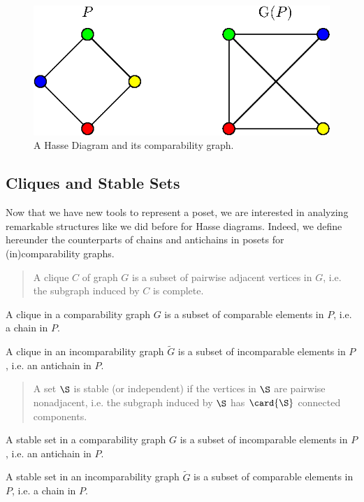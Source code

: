\begin{figure}
\centering
\includegraphics[height=0.2\textheight]{fig/comp-graph}
\caption{\label{fig:comp-graph} A Hasse Diagram and its comparability graph.}
\end{figure}




\subsection*{Cliques and Stable Sets}


Now that we have new tools to represent a poset, we are interested in analyzing
remarkable structures like we did before for Hasse diagrams. Indeed, we define
hereunder the counterparts of chains and antichains in posets for
(in)comparability graphs.

\begin{quotation}
A clique $C$ of graph $G$ is a subset of pairwise adjacent vertices in $G$,
i.e. the subgraph induced by $C$ is complete.
\end{quotation}

A clique in a comparability graph ${G}$ is a subset of comparable  elements in
${P}$, i.e. a chain in ${P}$.

A clique in an incomparability graph $\widetilde{G}$ is a subset of
incomparable  elements in ${P}$, i.e. an antichain in ${P}$.

\begin{quotation}
A set $\S$ is stable (or independent) if the vertices in $\S$ are pairwise
nonadjacent, i.e. the subgraph induced by $\S$ has $\card{\S}$ connected components.
\end{quotation}

A stable set in a comparability graph ${G}$ is a subset of incomparable
elements in ${P}$, i.e. an antichain in ${P}$.

A stable set in an incomparability graph $\widetilde{G}$ is a subset of
comparable elements in ${P}$, i.e. a chain in ${P}$.


